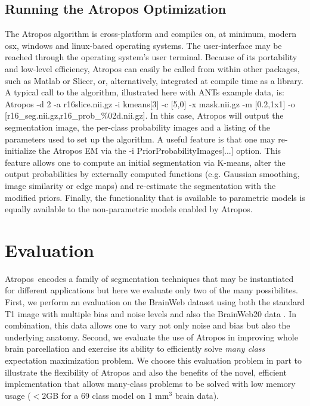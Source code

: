 \documentclass[11pt,english]{article}
\begin{document}
\subsection{Running the Atropos Optimization} 
The Atropos algorithm is cross-platform and compiles on, at minimum,
modern osx, windows and linux-based operating systems.  The
user-interface may be reached through the operating system's user
terminal.  Because of its portability and low-level efficiency,
Atropos can easily be called from within other packages, such as
Matlab or Slicer, or, alternatively, integrated at compile time as a
library.  A typical call to the algorithm, illustrated here with ANTs
example data, is:
{\ttfamily Atropos -d 2 -a r16slice.nii.gz -i kmeans[3] -c [5,0] -x
mask.nii.gz -m [0.2,1x1] -o
[r16\_seg.nii.gz,r16\_prob\_\%02d.nii.gz]}.  In this case, Atropos
will output the segmentation image, the per-class probability images
and a listing of the parameters used to set up the algorithm.  A
useful feature is that one may re-initialize the Atropos EM via the
{\ttfamily -i PriorProbabilityImages[...]} option.  This feature
allows one to compute an initial segmentation via K-means, alter the
output probabilities by externally computed
functions (e.g. Gaussian smoothing, image similarity or edge maps) and re-estimate the
segmentation with the modified priors.  Finally, the functionality
that is available to parametric models is equally available to the
non-parametric models enabled by Atropos.

\section{Evaluation}
Atropos~encodes a family of segmentation techniques that may be
instantiated for different applications but here we evaluate only two
of the many possibilites. First, we perform an evaluation on the
BrainWeb dataset using both the standard T1 image with multiple bias
and noise levels and also the BrainWeb20 data
\citep{Aubert-Broche2006a,Battaglini2008}.  In combination, this data
allows one to vary not only noise and bias but also the underlying
anatomy.  Second, we evaluate the use of Atropos in improving whole
brain parcellation and exercise its ability to efficiently solve {\em
many class} expectation maximization problem.  We choose this
evaluation problem in part to illustrate the flexibility of Atropos
and also the benefits of the novel, efficient implementation that
allows many-class problems to be solved with low memory usage ($<$2GB
for a 69 class model on 1 mm$^3$ brain data).
\end{document}
